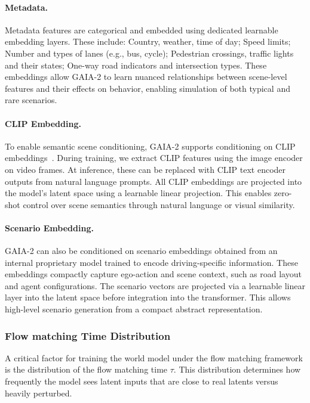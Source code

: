 \paragraph{Metadata.} Metadata features are categorical and embedded using dedicated learnable embedding layers. These include: Country, weather, time of day; Speed limits; Number and types of lanes (e.g., bus, cycle); Pedestrian crossings, traffic lights and their states; One-way road indicators and intersection types.
These embeddings allow GAIA-2 to learn nuanced relationships between scene-level features and their effects on behavior, enabling simulation of both typical and rare scenarios.


\paragraph{CLIP Embedding.} To enable semantic scene conditioning, GAIA-2 supports conditioning on CLIP embeddings~\cite{radford21}. During training, we extract CLIP features using the image encoder on video frames. At inference, these can be replaced with CLIP text encoder outputs from natural language prompts. All CLIP embeddings are projected into the model’s latent space using a learnable linear projection.
This enables zero-shot control over scene semantics through natural language or visual similarity.


\paragraph{Scenario Embedding.} GAIA-2 can also be conditioned on scenario embeddings obtained from an internal proprietary model trained to encode driving-specific information. These embeddings compactly capture ego-action and scene context, such as road layout and agent configurations. The scenario vectors are projected via a learnable linear layer into the latent space before integration into the transformer.
This allows high-level scenario generation from a compact abstract representation.


\subsubsection{Flow matching Time Distribution}
\label{subsubsection:flow-matching-distribution}
A critical factor for training the world model under the flow matching framework is the distribution of the flow matching time $\tau$. This distribution determines how frequently the model sees latent inputs that are close to real latents versus heavily perturbed.

